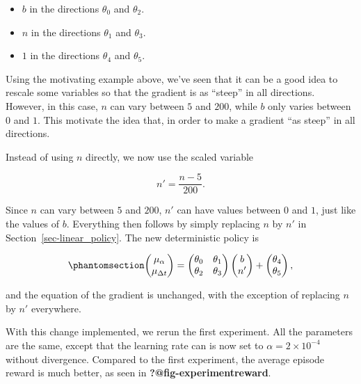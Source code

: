\documentclass[
  letterpaper,
]{report}
\providecommand{\tightlist}{%
  \setlength{\itemsep}{0pt}\setlength{\parskip}{0pt}}\usepackage{longtable,booktabs,array}
\theoremstyle{definition}
\theoremstyle{plain}
\theoremstyle{definition}
\theoremstyle{remark}
\begin{document}
\begin{itemize}
\tightlist
\item
  \(b\) in the directions \(\theta_0\) and \(\theta_2\).
\item
  \(n\) in the directions \(\theta_1\) and \(\theta_3\).
\item
  \(1\) in the directions \(\theta_4\) and \(\theta_5\).
\end{itemize}

Using the motivating example above, we've seen that it can be a good
idea to rescale some variables so that the gradient is as ``steep'' in
all directions. However, in this case, \(n\) can vary between \(5\) and
\(200\), while \(b\) only varies between \(0\) and \(1\). This motivate
the idea that, in order to make a gradient ``as steep'' in all
directions.

Instead of using \(n\) directly, we now use the scaled variable

\[
n' = \frac{n-5}{200}.
\]

Since \(n\) can vary between \(5\) and \(200\), \(n'\) can have values
between \(0\) and \(1\), just like the values of \(b\). Everything then
follows by simply replacing \(n\) by \(n'\) in
Section~\ref{sec-linear_policy}. The new deterministic policy is

\begin{equation}\phantomsection\label{eq-policy2_deterministic_part}{
\begin{pmatrix}
\mu_\alpha \\
\mu_{\Delta t}
\end{pmatrix} = 
\begin{pmatrix}
\theta_0 & \theta_1\\
\theta_2 & \theta_3
\end{pmatrix} 
\begin{pmatrix}
b\\
n'
\end{pmatrix} +
\begin{pmatrix}
\theta_4\\
\theta_5
\end{pmatrix},
}\end{equation}

and the equation of the gradient is unchanged, with the exception of
replacing \(n\) by \(n'\) everywhere.

With this change implemented, we rerun the first experiment. All the
parameters are the same, except that the learning rate can is now set to
\(\alpha = 2\times 10^{-4}\) without divergence. Compared to the first
experiment, the average episode reward is much better, as seen in
\textbf{?@fig-experimentreward}.
\end{document}
